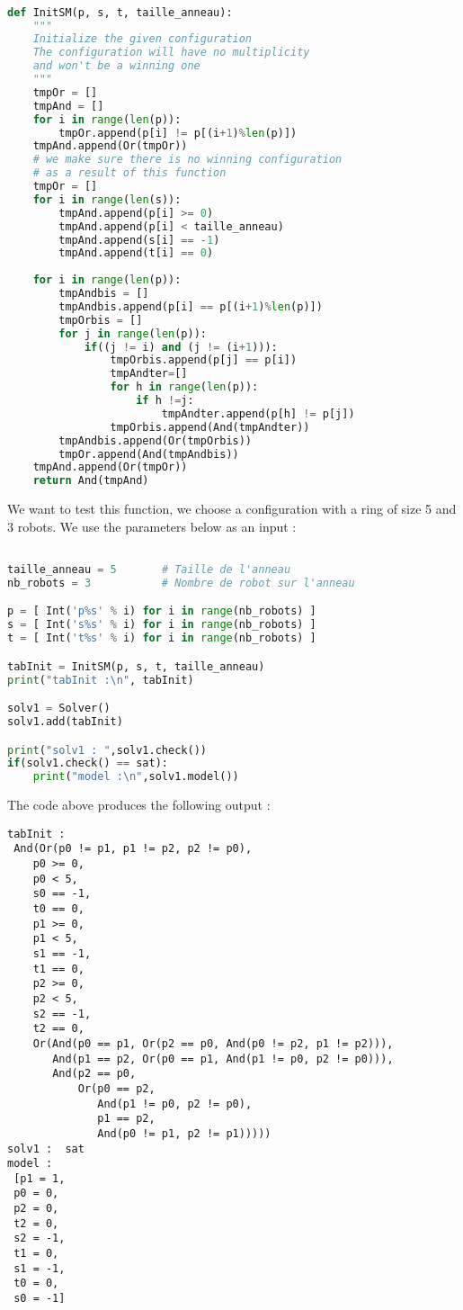 \documentclass{article}
\begin{document}
\begin{lstlisting}[language=Python]

def InitSM(p, s, t, taille_anneau):
    """
    Initialize the given configuration
    The configuration will have no multiplicity
    and won't be a winning one
    """
    tmpOr = []
    tmpAnd = []
    for i in range(len(p)):
        tmpOr.append(p[i] != p[(i+1)%len(p)])
    tmpAnd.append(Or(tmpOr))
    # we make sure there is no winning configuration
    # as a result of this function
    tmpOr = []
    for i in range(len(s)):
        tmpAnd.append(p[i] >= 0)
        tmpAnd.append(p[i] < taille_anneau)
        tmpAnd.append(s[i] == -1)
        tmpAnd.append(t[i] == 0)
    
    for i in range(len(p)):
        tmpAndbis = []
        tmpAndbis.append(p[i] == p[(i+1)%len(p)])
        tmpOrbis = []
        for j in range(len(p)):
            if((j != i) and (j != (i+1))):
                tmpOrbis.append(p[j] == p[i])
                tmpAndter=[]
                for h in range(len(p)):
                    if h !=j:
                        tmpAndter.append(p[h] != p[j])
                tmpOrbis.append(And(tmpAndter))
        tmpAndbis.append(Or(tmpOrbis))
        tmpOr.append(And(tmpAndbis))
    tmpAnd.append(Or(tmpOr))
    return And(tmpAnd)
\end{lstlisting}

We want to test this function, we choose a configuration with a ring of size 5 and 3 robots. We use the parameters below as an input :
\begin{lstlisting}[language=Python]

taille_anneau = 5       # Taille de l'anneau 
nb_robots = 3           # Nombre de robot sur l'anneau

p = [ Int('p%s' % i) for i in range(nb_robots) ]
s = [ Int('s%s' % i) for i in range(nb_robots) ]
t = [ Int('t%s' % i) for i in range(nb_robots) ]

tabInit = InitSM(p, s, t, taille_anneau)
print("tabInit :\n", tabInit)

solv1 = Solver()
solv1.add(tabInit)

print("solv1 : ",solv1.check())
if(solv1.check() == sat):
    print("model :\n",solv1.model())
\end{lstlisting}
The code above produces the following output : 
\begin{lstlisting}
tabInit :
 And(Or(p0 != p1, p1 != p2, p2 != p0),
    p0 >= 0,
    p0 < 5,
    s0 == -1,
    t0 == 0,
    p1 >= 0,
    p1 < 5,
    s1 == -1,
    t1 == 0,
    p2 >= 0,
    p2 < 5,
    s2 == -1,
    t2 == 0,
    Or(And(p0 == p1, Or(p2 == p0, And(p0 != p2, p1 != p2))),
       And(p1 == p2, Or(p0 == p1, And(p1 != p0, p2 != p0))),
       And(p2 == p0,
           Or(p0 == p2,
              And(p1 != p0, p2 != p0),
              p1 == p2,
              And(p0 != p1, p2 != p1)))))
solv1 :  sat
model :
 [p1 = 1,
 p0 = 0,
 p2 = 0,
 t2 = 0,
 s2 = -1,
 t1 = 0,
 s1 = -1,
 t0 = 0,
 s0 = -1]
\end{lstlisting}
\end{document}
